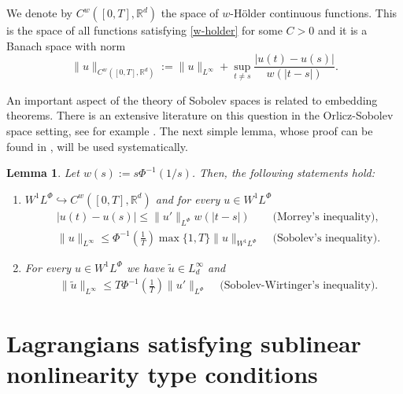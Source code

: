\documentclass[twoside]{article}
\newtheorem{lem}[thm]{Lemma}
\theoremstyle{remark}
\newcommand{\orlnor}{\|_{L^{\Phi}}}
\newcommand{\lphi}{L^{\Phi}}
\newcommand{\wphi}{W^{1}\lphi}
\newcommand{\sobnor}{\|_{W^{1}\lphi}}
\newcommand{\rr}{\mathbb{R}}
\renewcommand{\leq}{\leqslant}
\begin{document}
We denote by $C^w([0,T],\rr^d)$  the space of  $w$-H\"older continuous functions. This is the space of all functions satisfying \eqref{w-holder} for some $C>0$ and it is a Banach space with norm
\[\|u\|_{  C^w([0,T],\rr^d) }  :=\|u\|_{L^{\infty}}+\sup\limits_{t\neq s}\frac{|u(t)-u(s)|}{w(|t-s|)}.\]





 An important aspect of the theory of Sobolev spaces is related to embedding theorems. There is an extensive literature on this question in the  Orlicz-Sobolev space setting, see for example
 \cite{cianchi2000fully,cianchi1999some,claverooptimal,edmunds2000optimal,kerman2006optimal}.
The next simple lemma, whose proof can be found in \cite{ABGMS2015}, will be used systematically.




\begin{lem}\label{inclusion orlicz} Let  $w(s):= s\Phi^{-1}(1/s)$. Then, the following statements hold:
\begin{enumerate}
\item\label{inclusion orlicz_item1} $\wphi\hookrightarrow C^w([0,T],\rr^d) $ and for every $u\in\wphi$
\begin{align}
 &\left|u(t)-u(s) \right| \leq  \|u'\orlnor w(| t-s|)&\text{  (Morrey's inequality),}\label{in-sob-cont}
\\
& \|u\|_{L^{\infty}} \leq\Phi^{-1}\left(\frac{1}{T}\right)\max\{1,T\}\|u\sobnor&\text{  (Sobolev's inequality).}\label{sobolev}
\end{align}
\item For every $u\in\wphi$ we have $\widetilde{u}\in L^{\infty}_d$ and
\begin{align}
& \|\widetilde{u}\|_{L^{\infty}} \leq T\Phi^{-1}\left(\frac{1}{T}\right)\|u'\orlnor&
\text{  (Sobolev-Wirtinger's inequality).}\label{wirtinger}
\end{align}




\end{enumerate}
\end{lem}






\section{Lagrangians satisfying  sublinear nonlinearity type conditions}
\end{document}
